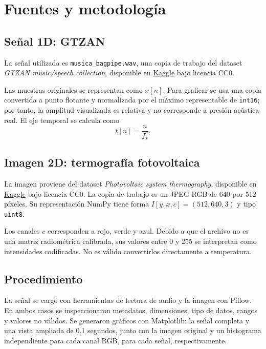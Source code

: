 \documentclass[11pt,a4paper]{article}
\begin{document}
\section{Fuentes y metodología}

\subsection{Señal 1D: GTZAN}

La señal utilizada es \texttt{musica\_bagpipe.wav}, una copia de trabajo del
dataset \emph{GTZAN music/speech collection}, disponible en
\href{https://www.kaggle.com/datasets/lnicalo/gtzan-musicspeech-collection}
{Kaggle} bajo licencia CC0.

Las muestras originales se representan como \(x[n]\). Para graficar se usa
una copia convertida a punto flotante y normalizada por el máximo representable
de \texttt{int16}; por tanto, la amplitud visualizada es relativa y no
corresponde a presión acústica real. El eje temporal se calcula como
\[
t[n] = \frac{n}{f_s}.
\]

\subsection{Imagen 2D: termografía fotovoltaica}

La imagen proviene del dataset \emph{Photovoltaic system thermography},
disponible en
\href{https://www.kaggle.com/datasets/marcosgabriel/photovoltaic-system-thermography}
{Kaggle} bajo licencia CC0. La copia de trabajo es un JPEG RGB de 640 por
512 píxeles. Su representación NumPy tiene forma
\(I[y,x,c]=(512,640,3)\) y tipo \texttt{uint8}.

Los canales \(c\) corresponden a rojo, verde y azul. Debido a que el archivo
no es una matriz radiométrica calibrada, sus valores entre 0 y 255 se
interpretan como intensidades codificadas. No es válido convertirlos
directamente a temperatura.

\subsection{Procedimiento}

La señal se cargó con herramientas de lectura de audio y la imagen con
Pillow. En ambos casos se inspeccionaron metadatos, dimensiones, tipo de
datos, rangos y valores no válidos. Se generaron gráficos con Matplotlib:
la señal completa y una vista ampliada de 0,1 segundos, junto con la imagen
original y un histograma independiente para cada canal RGB, para cada señal, respectivamente.
\end{document}
